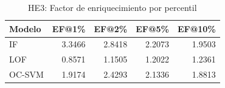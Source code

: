 \begin{table}[htbp]
\centering
\small
\caption{HE3: Factor de enriquecimiento por percentil}
\label{tab:he3-results}
\begin{tabular}{lrrrr}
\toprule
Modelo & EF@1\% & EF@2\% & EF@5\% & EF@10\% \\
\midrule
  IF & 3.3466 & 2.8418 & 2.2073 & 1.9503 \\
  LOF & 0.8571 & 1.1505 & 1.2022 & 1.2361 \\
  OC-SVM & 1.9174 & 2.4293 & 2.1336 & 1.8813 \\
\bottomrule
\end{tabular}
\end{table}
